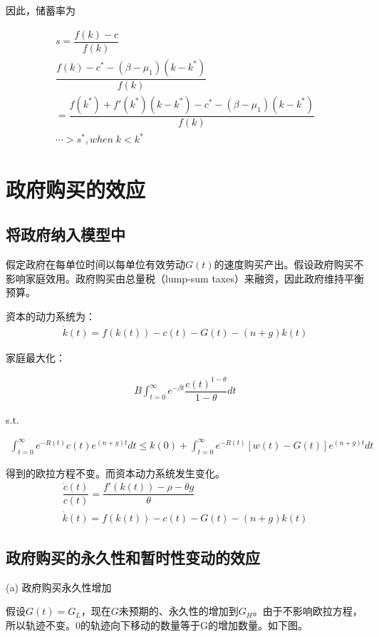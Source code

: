 因此，储蓄率为

\begin{align}
	s=\dfrac{f(k)-c}{f(k)}
	\\
	\dfrac{f(k)-c^*-(\beta-\mu_1)(k-k^*)}{f(k)}
	\\
    =\dfrac{f(k^*)+f'(k^*)(k-k^*)-c^*-(\beta-\mu_1)(k-k^*)}{f(k)}
    \\
    \cdots >s^*,when \; k<k^*
\end{align}



\section{政府购买的效应}

\subsection{将政府纳入模型中}
假定政府在每单位时间以每单位有效劳动$ G(t) $的速度购买产出。假设政府购买不影响家庭效用。政府购买由总量税（lump-sum taxes）来融资，因此政府维持平衡预算。

资本的动力系统为：
\begin{gather}
	\dot{k}(t)=f(k(t))-c(t)-G(t)-(n+g)k(t)
\end{gather}

家庭最大化：

\begin{gather}
	B\int_{t=0}^{\infty}e^{-\beta t}\dfrac{c(t)^{1-\theta}}{1-\theta}dt
\end{gather}

s.t. 

\begin{gather}
	\int_{t=0}^{\infty}e^{-R(t)}c(t)e^{(n+g)t}dt\le 
	k(0)+\int_{t=0}^{\infty}e^{-R(t)}[w(t)-G(t)]e^{(n+g)t}dt
\end{gather}

得到的欧拉方程不变。而资本动力系统发生变化。
\begin{gather}
	\dfrac{\dot{c}(t)}{c(t)}=\dfrac{f'(k(t))-\rho-\theta g}{\theta}
	\\
	\dot{k}(t)=f(k(t))-c(t)-G(t)-(n+g)k(t)
\end{gather}

\subsection{政府购买的永久性和暂时性变动的效应} 

(a) 政府购买永久性增加

假设$ G(t) = G_L $，现在$ G $未预期的、永久性的增加到$ G_H $。由于不影响欧拉方程，所以轨迹不变。0的轨迹向下移动的数量等于G的增加数量。如下图。


